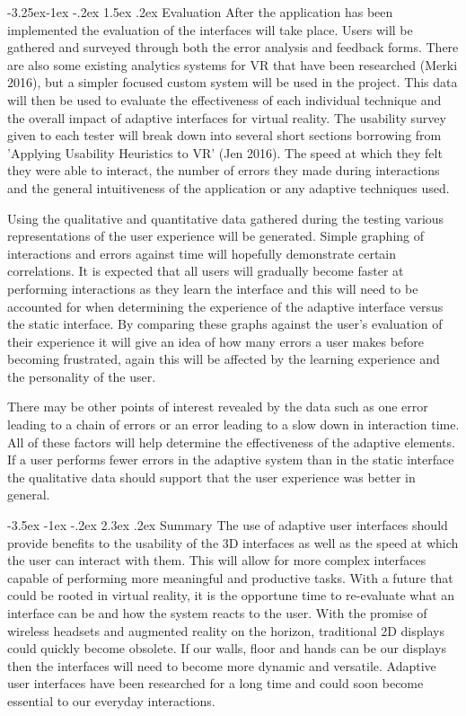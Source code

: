 \documentclass[9pt,twocolumn]{article}
\makeatletter
\renewcommand{\section}{\@startsection {section}{1}{\z@}%
             {-3.5ex \@plus -1ex \@minus -.2ex}%
             {2.3ex \@plus .2ex}%
             {\normalfont\Large\scshape\bfseries}}
\renewcommand{\subsection}{\@startsection{subsection}{2}{\z@}%
             {-3.25ex\@plus -1ex \@minus -.2ex}%
             {1.5ex \@plus .2ex}%
             {\normalfont\large\scshape\bfseries}}
\makeatother
\begin{document}
\subsection{Evaluation}
After the application has been implemented the evaluation of the interfaces will take place. Users will be gathered and surveyed through both the error analysis and feedback forms. There are also some existing analytics systems for VR that have been researched (Merki 2016), but a simpler focused custom system will be used in the project. This data will then be used to evaluate the effectiveness of each individual technique and the overall impact of adaptive interfaces for virtual reality. The usability survey given to each tester will break down into several short sections borrowing from 'Applying Usability Heuristics to VR' (Jen 2016). The speed at which they felt they were able to interact, the number of errors they made during interactions and the general intuitiveness of the application or any adaptive techniques used.

Using the qualitative and quantitative data gathered during the testing various representations of the user experience will be generated. Simple graphing of interactions and errors against time will hopefully demonstrate certain correlations. It is expected that all users will gradually become faster at performing interactions as they learn the interface and this will need to be accounted for when determining the experience of the adaptive interface versus the static interface. By comparing these graphs against the user's evaluation of their experience it will give an idea of how many errors a user makes before becoming frustrated, again this will be affected by the learning experience and the personality of the user. 

There may be other points of interest revealed by the data such as one error leading to a chain of errors or an error leading to a slow down in interaction time. All of these factors will help determine the effectiveness of the adaptive elements. If a user performs fewer errors in the adaptive system than in the static interface the qualitative data should support that the user experience was better in general.

\section{Summary}
The use of adaptive user interfaces should provide benefits to the usability of the 3D interfaces as well as the speed at which the user can interact with them. This will allow for more complex interfaces capable of performing more meaningful and productive tasks. With a future that could be rooted in virtual reality, it is the opportune time to re-evaluate what an interface can be and how the system reacts to the user. With the promise of wireless headsets and augmented reality on the horizon, traditional 2D displays could quickly become obsolete. If our walls, floor and hands can be our displays then the interfaces will need to become more dynamic and versatile. Adaptive user interfaces have been researched for a long time and could soon become essential to our everyday interactions.
\end{document}

